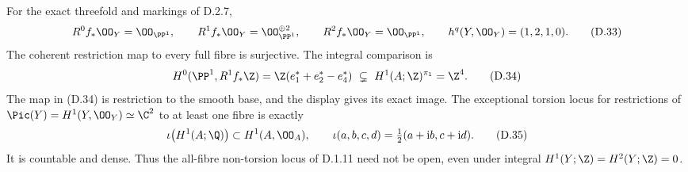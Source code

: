 \begin{proposition}
\label{st:D.2.8}
For the exact threefold and markings of D.2.7,
\[
 R^0f_*\OO_Y=\OO_{\PP^1},\qquad
 R^1f_*\OO_Y=\OO_{\PP^1}^{\oplus2},\qquad
 R^2f_*\OO_Y=\OO_{\PP^1},
 \qquad h^q(Y,\OO_Y)=(1,2,1,0).
\tag{D.33}
\]
The coherent restriction map to every full fibre is surjective.
The integral comparison is
\[
 H^0(\PP^1,R^1f_*\Z)
   =\Z(e_1^*+e_2^*-e_4^*)
   \ \subsetneq\ H^1(A;\Z)^{\pi_1}=\Z^4.
\tag{D.34}
\]
The map in (D.34) is restriction to the smooth base, and the
display gives its exact image. The exceptional torsion locus
for restrictions of $\Pic(Y)=H^1(Y,\OO_Y)\simeq\C^2$ to
at least one fibre is exactly
\[
 \iota\bigl(H^1(A;\Q)\bigr)\subset H^1(A,\OO_A),
 \qquad
 \iota(a,b,c,d)=\tfrac12(a+\mathrm i b,c+\mathrm i d).
\tag{D.35}
\]
It is countable and dense. Thus the all-fibre non-torsion locus
of D.1.11 need not be open, even under integral
$H^1(Y;\Z)=H^2(Y;\Z)=0$.
\end{proposition}
